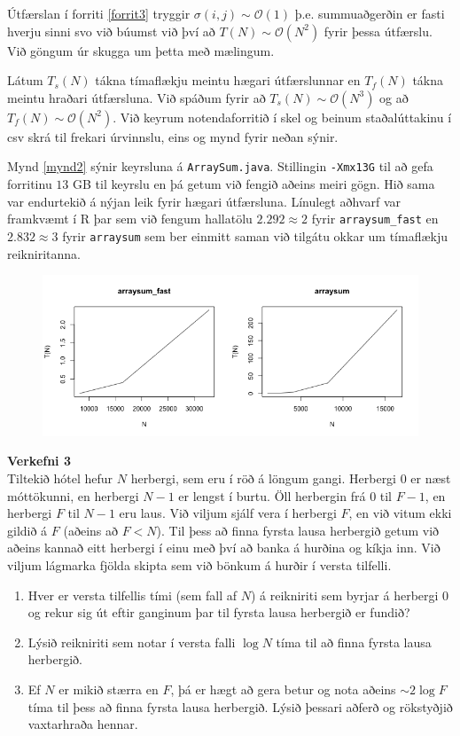 \documentclass[12pt, a4paper, hidelinks]{article}
\begin{document}
\noindent
Útfærslan í forriti \ref{forrit3} tryggir $\sigma(i, j) \sim \mathcal O(1)$ þ.e. summuaðgerðin er fasti hverju sinni svo við
búumst við því að $T(N) \sim \mathcal O(N^2)$ fyrir þessa útfærslu. Við göngum úr skugga um þetta með mælingum.

Látum $T_s(N)$ tákna tímaflækju meintu hægari útfærslunnar en $T_f(N)$ tákna meintu
hraðari útfærsluna. Við spáðum fyrir að $T_s(N) \sim \mathcal O(N^3)$ og að $T_f(N) \sim \mathcal O(N^2)$.
Við keyrum notendaforritið í skel og beinum staðalúttakinu í csv skrá til frekari úrvinnslu, eins og mynd fyrir neðan sýnir.

Mynd \ref{mynd2} sýnir keyrsluna á \texttt{ArraySum.java}. Stillingin \texttt{-Xmx13G} til að gefa forritinu $13$ GB
til keyrslu en þá getum við fengið aðeins meiri gögn. Hið sama var endurtekið á nýjan leik fyrir hægari útfærsluna.
Línulegt aðhvarf var framkvæmt í R þar sem við fengum hallatölu $2.292 \approx 2$ fyrir \texttt{arraysum_fast} en $2.832 \approx 3$
fyrir \texttt{arraysum} sem ber einmitt saman við tilgátu okkar um tímaflækju reikniritanna.

\begin{figure}[ht!]
    \centering
    \includegraphics[width=\textwidth]{img/speed_comparison_nonlog.png}
\end{figure}


\newpage
\noindent
\textbf{\large Verkefni 3} \medskip \\
Tiltekið hótel hefur $N$ herbergi, sem eru í röð á löngum gangi. Herbergi $0$ er næst móttökunni, en herbergi $N-1$ er lengst í burtu.
Öll herbergin frá $0$ til $F-1$, en herbergi $F$ til $N-1$ eru laus. Við viljum sjálf vera í herbergi $F$, en við vitum ekki gildið á $F$
(aðeins að $F < N$). Til þess að finna fyrsta lausa herbergið getum við aðeins kannað eitt herbergi í einu með því að banka á hurðina og kíkja
inn. Við viljum lágmarka fjölda skipta sem við bönkum á hurðir í versta tilfelli.

\begin{enumerate}[label=(\alph*)]
    \item Hver er versta tilfellis tími (sem fall af $N$) á reikniriti sem byrjar á herbergi $0$ og rekur sig út eftir ganginum þar til fyrsta
    lausa herbergið er fundið?
    \item Lýsið reikniriti sem notar í versta falli $\log N$ tíma til að finna fyrsta lausa herbergið.
    \item Ef $N$ er mikið stærra en $F$, þá er hægt að gera betur og nota aðeins $\sim 2 \log F$ tíma til þess að finna fyrsta lausa herbergið.
    Lýsið þessari aðferð og rökstyðjið vaxtarhraða hennar.
\end{enumerate}
\end{document}
